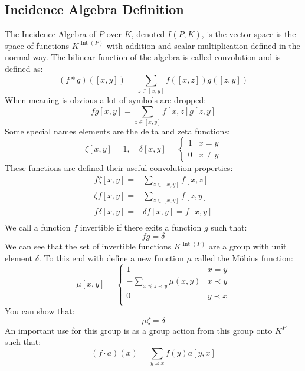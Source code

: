 \subsection{Incidence Algebra Definition}
The Incidence Algebra of $P$ over $K$, denoted $I(P,K)$, is the vector space is the space of functions $K^{\operatorname{Int}(P)}$ with addition and scalar multiplication defined in the normal way.
The bilinear function of the algebra is called convolution and is defined as:
\[(f*g)([x,y]) = \sum_{z\in [x,y]}f([x,z])g([z,y])\]
When meaning is obvious a lot of symbols are dropped:
\[fg[x,y] = \sum_{z\in [x,y]}f[x,z]g[z,y]\]
Some special names elements are the delta and zeta functions:
\[\zeta[x,y] = 1,\quad\delta[x,y] = \begin{cases}1&x=y\\0&x\neq y\end{cases}\]
These functions are defined their useful convolution properties:
\begin{equation*}
\begin{aligned}
	f\zeta[x,y] =& \sum_{z\in [x,y]}f[x,z]\\
	\zeta f[x,y] =& \sum_{z\in [x,y]}f[z,y]\\
	f\delta[x,y] =& \delta f[x,y] = f[x,y]\\
\end{aligned}
\end{equation*}
We call a function $f$ invertible if there exits a function $g$ such that:
\[fg=\delta\]
We can see that the set of invertible functions $K^{\operatorname{Int}(P)}$ are a group with unit element $\delta$.
To this end  with define a new function $\mu$ called the Möbius function:
\[\mu[x,y] = \begin{cases}1&x=y\\-\sum_{x\preceq z\prec y}\mu(x,y)&x\prec y\\0&y\prec x\\\end{cases}\]
You can show that:
\[\mu\zeta = \delta\]
An important use for this group is as a group action from this group onto $K^P$ such that:
\[(f\cdot a)(x) = \sum_{y\preceq x}f(y)a[y,x]\]

